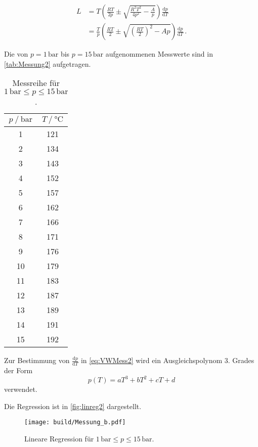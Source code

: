 \begin{align}
  \nonumber
  L &= T \left(\frac{RT}{2p} \pm \sqrt{\frac{R^2 T^2}{4 p^2} - \frac{A}{p}} \right) 
  \frac{\mathrm{d}p}{\mathrm{d}T} \\
    &= \frac{T}{p} \left(\frac{RT}{2} \pm \sqrt{\left(\frac{R T}{2} \right)^2 - A p}\right) 
    \frac{\mathrm{d}p}{\mathrm{d}T} \,. 
    \label{eq:VWMess2}
\end{align}

\newpage

Die von $p = 1 \,\unit{\bar}$ bis $p = 15 \,\unit{\bar}$ aufgenommenen Messwerte sind in 
\autoref{tab:Messung2} aufgetragen.

\begin{table}[H]
  \centering
  \caption{Messreihe für  $1 \,\unit{\bar} \leq p \leq 15 \,\unit{\bar} $.}
  \label{tab:Messung2}
  \begin{tabular}{S S}
    \toprule
    {$p \mathbin{/} \unit{\bar}$} & {$T \mathbin{/} \unit{\celsius}$} \\
     & 121 \\
     2 & 134 \\
     3 & 143 \\
     4 & 152 \\
     5 & 157 \\
     6 & 162 \\
     7 & 166 \\
     8 & 171 \\
     9 & 176 \\
    10 & 179 \\
    11 & 183 \\
    12 & 187 \\
    13 & 189 \\
    14 & 191 \\
    15 & 192 \\
    \bottomrule
  \end{tabular}
\end{table}

Zur Bestimmung von $\frac{\mathrm{d}p}{\mathrm{d}T}$ in \eqref{eq:VWMess2} wird ein Ausgleichspolynom
3. Grades der Form
\begin{equation*}
  p(T) = a T^3 + b T^2 + c T + d
\end{equation*} verwendet.

Die Regression ist in \autoref{fig:linreg2} dargestellt.

\begin{figure}
  \centering
  \texttt{[image: build/Messung\_b.pdf]}
  \caption{Lineare Regression für $1 \,\unit{\bar} \leq p \leq 15 \,\unit{\bar}$.}
  \label{fig:linreg2}
\end{figure}

